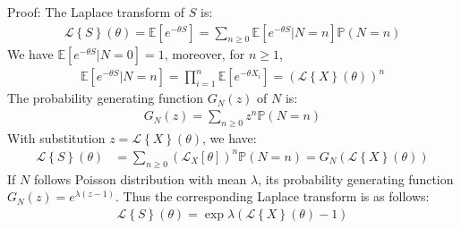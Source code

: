 Proof: The Laplace transform of $S$ is:
\begin{align*}
\mathcal{L} \left\lbrace S \right\rbrace \left( \theta \right)  = \mathbb{E}\left[ e^{-\theta S}  \right] = \sum_{n \geq 0}  \mathbb{E}\left[ e^ {-\theta S }| N = n\right ] \mathbb{P}\left( N = n\right) 
\end{align*}
We have $\mathbb{E}\left[ e^{-\theta S} | N = 0 \right] = 1$, moreover, for $n \geq 1$,
\begin{align*}
\mathbb{E}\left[ e^ {-\theta S }| N = n\right ] 
= \prod_{i=1}^{n} \mathbb{E}\left[ e^ {-\theta X_i}\right] 
= \left( \mathcal{L} \left\lbrace X \right\rbrace \left( \theta \right)   \right) ^ n
\end{align*}
The probability generating function  $G_N\left( z \right)$ of $N$ is:
\begin{align*}
G_N\left( z \right)  = \sum_{n \geq 0} z^n \mathbb{P}\left( N = n \right) 
\end{align*}
With substitution $z=\mathcal{L} \left\lbrace X \right\rbrace \left( \theta \right)$, we have:
\begin{align*}
\mathcal{L} \left\lbrace S \right\rbrace \left( \theta \right)   &= \sum_{n \geq 0} \left( \mathcal{L}_X\left[ \theta \right] \right) ^ n \mathbb{P}\left( N = n \right) 
= G_N\left(  \mathcal{L} \left\lbrace X \right\rbrace \left( \theta \right)  \right) 
\end{align*}
If $N$ follows Poisson distribution with mean $\lambda$, its probability generating function $G_N\left( z \right) =  e^{\lambda\left( z - 1\right) }$. Thus the corresponding Laplace transform is as follows:
\begin{align}
\label{eq:laplace-transform-comound-RV}
\mathcal{L} \left\lbrace S \right\rbrace \left( \theta \right) = \exp{\lambda\left(  \mathcal{L} \left\lbrace X \right\rbrace \left( \theta \right) - 1\right) } 
\end{align}

